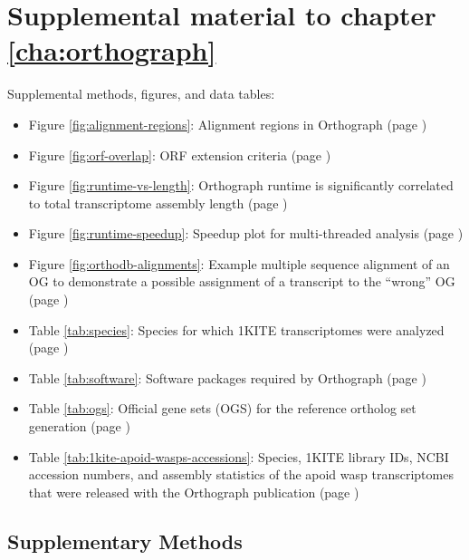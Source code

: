 \chapter{Supplemental material to chapter \ref{cha:orthograph}}

\ifdraft{%
}%
{%
}%

Supplemental methods, figures, and data tables:

\begin{itemize}
	\item Figure \ref{fig:alignment-regions}: Alignment regions in Orthograph (page \pageref{fig:alignment-regions})
	\item Figure \ref{fig:orf-overlap}: ORF extension criteria (page \pageref{fig:orf-overlap})
	\item Figure \ref{fig:runtime-vs-length}: Orthograph runtime is significantly correlated to total transcriptome assembly length (page \pageref{fig:runtime-vs-length})
	\item Figure \ref{fig:runtime-speedup}: Speedup plot for multi-threaded analysis (page \pageref{fig:runtime-speedup})
	\item Figure \ref{fig:orthodb-alignments}: Example multiple sequence alignment of an OG to demonstrate a possible assignment of a transcript to the ``wrong'' OG (page \pageref{fig:orthodb-alignments})
\end{itemize}

\begin{itemize}
	\item Table \ref{tab:species}: Species for which 1KITE transcriptomes were analyzed (page \pageref{tab:species})
	\item Table \ref{tab:software}: Software packages required by Orthograph (page \pageref{tab:software})
	\item Table \ref{tab:ogs}: Official gene sets (OGS) for the reference ortholog set generation (page \pageref{tab:ogs})
	\item Table \ref{tab:1kite-apoid-wasps-accessions}: Species, 1KITE library IDs, NCBI accession numbers, and assembly statistics of the apoid 
wasp transcriptomes that were released with the Orthograph publication (page \pageref{tab:1kite-apoid-wasps-accessions})
\end{itemize}

\section{Supplementary Methods}


